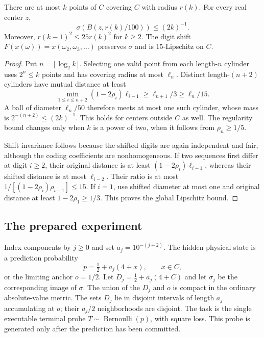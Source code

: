\begin{lemma}\label{lem:moran-profile}
There are at most $k$ points of $C$ covering $C$ with radius $r(k)$. For every real center $z$,
\[
 \sigma(B(z,r(k)/100))\le(2k)^{-1}.
\]
Moreover, $r(k-1)^2\le25r(k)^2$ for $k\ge2$. The digit shift
$F(x(\omega))=x(\omega_2,\omega_3,\ldots)$ preserves $\sigma$ and is $15$-Lipschitz on $C$.
\end{lemma}
\begin{proof}
Put $n=\lfloor\log_2k\rfloor$. Selecting one valid point from each length-$n$ cylinder uses $2^n\le k$ points and has covering radius at most $\ell_n$. Distinct length-$(n+2)$ cylinders have mutual distance at least
\[
 \min_{1\le i\le n+2}(1-2\rho_i)\ell_{i-1}
       \ge\ell_{n+1}/3\ge\ell_n/15.
\]
A ball of diameter $\ell_n/50$ therefore meets at most one such cylinder, whose mass is $2^{-(n+2)}\le(2k)^{-1}$. This holds for centers outside $C$ as well. The regularity bound changes only when $k$ is a power of two, when it follows from $\rho_n\ge1/5$.

Shift invariance follows because the shifted digits are again independent and fair, although the coding coefficients are nonhomogeneous. If two sequences first differ at digit $i\ge2$, their original distance is at least $(1-2\rho_i)\ell_{i-1}$, whereas their shifted distance is at most $\ell_{i-2}$. Their ratio is at most $1/[(1-2\rho_i)\rho_{i-1}]\le15$. If $i=1$, use shifted diameter at most one and original distance at least $1-2\rho_1\ge1/3$. This proves the global Lipschitz bound.
\end{proof}

\subsection{The prepared experiment}
Index components by $j\ge0$ and set $a_j=10^{-(j+2)}$. The hidden physical state is a prediction probability
\[
 p=\tfrac12+a_j(4+x),\qquad x\in C,
\]
or the limiting anchor $o=1/2$. Let $D_j=\tfrac12+a_j(4+C)$ and let $\sigma_j$ be the corresponding image of $\sigma$. The union of the $D_j$ and $o$ is compact in the ordinary absolute-value metric. The sets $D_j$ lie in disjoint intervals of length $a_j$ accumulating at $o$; their $a_j/2$ neighborhoods are disjoint. The task is the single executable terminal probe $T\sim\operatorname{Bernoulli}(p)$, with square loss. This probe is generated only after the prediction has been committed.

